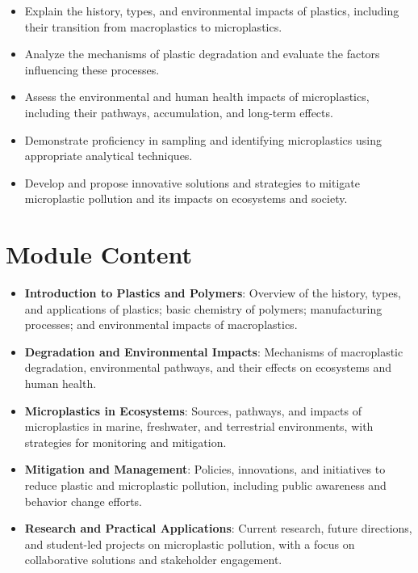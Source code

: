 \documentclass[
  letterpaper,
  10pt,
  openany]{book}
\providecommand{\tightlist}{%
  \setlength{\itemsep}{0pt}\setlength{\parskip}{0pt}}\usepackage{longtable,booktabs,array}
\begin{document}

\begin{itemize}
\tightlist
\item
  Explain the history, types, and environmental impacts of plastics,
  including their transition from macroplastics to microplastics.
\item
  Analyze the mechanisms of plastic degradation and evaluate the factors
  influencing these processes.
\item
  Assess the environmental and human health impacts of microplastics,
  including their pathways, accumulation, and long-term effects.
\item
  Demonstrate proficiency in sampling and identifying microplastics
  using appropriate analytical techniques.
\item
  Develop and propose innovative solutions and strategies to mitigate
  microplastic pollution and its impacts on ecosystems and society.
\end{itemize}

\section*{Module Content}\label{module-content-5}


\begin{itemize}
\tightlist
\item
  \textbf{Introduction to Plastics and Polymers}: Overview of the
  history, types, and applications of plastics; basic chemistry of
  polymers; manufacturing processes; and environmental impacts of
  macroplastics.
\item
  \textbf{Degradation and Environmental Impacts}: Mechanisms of
  macroplastic degradation, environmental pathways, and their effects on
  ecosystems and human health.
\item
  \textbf{Microplastics in Ecosystems}: Sources, pathways, and impacts
  of microplastics in marine, freshwater, and terrestrial environments,
  with strategies for monitoring and mitigation.
\item
  \textbf{Mitigation and Management}: Policies, innovations, and
  initiatives to reduce plastic and microplastic pollution, including
  public awareness and behavior change efforts.
\item
  \textbf{Research and Practical Applications}: Current research, future
  directions, and student-led projects on microplastic pollution, with a
  focus on collaborative solutions and stakeholder engagement.
\end{itemize}
\end{document}
